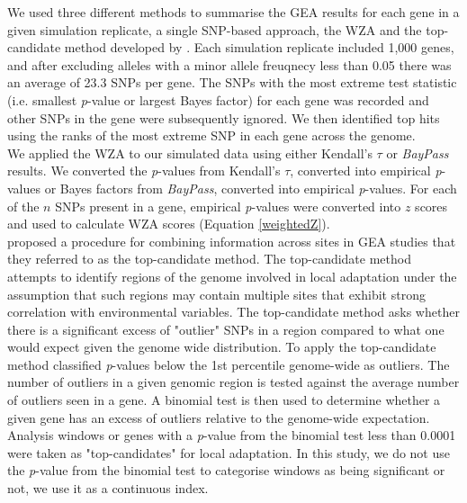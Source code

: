 \documentclass[10pt,twoside,lineno]{GSA_format}
\begin{document}
We used three different methods to summarise the GEA results for each gene in a given simulation replicate, a single SNP-based approach, the WZA and the top-candidate method developed by \cite{Yeaman2016}. Each simulation replicate included 1,000 genes, and after excluding alleles with a minor allele freuqnecy less than 0.05 there was an average of 23.3 SNPs per gene. The SNPs with the most extreme test statistic (i.e. smallest \textit{p}-value or largest Bayes factor) for each gene was recorded and other SNPs in the gene were subsequently ignored. We then identified top hits using the ranks of the most extreme SNP in each gene across the genome.\\

We applied the WZA to our simulated data using either Kendall's $\tau$ or \textit{BayPass} results. We converted the \textit{p}-values from Kendall's $\tau$, converted into empirical \textit{p}-values or Bayes factors from \textit{BayPass}, converted into empirical \textit{p}-values. For each of the $n$ SNPs present in a gene, empirical \textit{p}-values were converted into $z$ scores and used to calculate WZA scores (Equation \ref{weightedZ}). \\

\cite{Yeaman2016} proposed a procedure for combining information across sites in GEA studies that they referred to as the top-candidate method. The top-candidate method attempts to identify regions of the genome involved in local adaptation under the assumption that such regions may contain multiple sites that exhibit strong correlation with environmental variables. The top-candidate method asks whether there is a significant excess of "outlier" SNPs in a region compared to what one would expect given the genome wide distribution. To apply the top-candidate method \cite{Yeaman2016} classified \textit{p}-values below the 1st percentile genome-wide as outliers. The number of outliers in a given genomic region is tested against the average number of outliers seen in a gene. A binomial test is then used to determine whether a given gene has an excess of outliers relative to the genome-wide expectation. Analysis windows or genes with a \textit{p}-value from the binomial test less than 0.0001 were taken as "top-candidates" for local adaptation. In this study, we do not use the \textit{p}-value from the binomial test to categorise windows as being significant or not, we use it as a continuous index.\\

\end{document}
